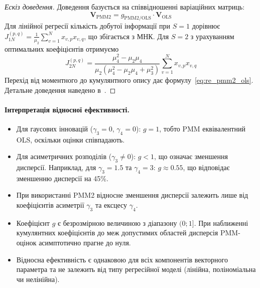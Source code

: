 \documentclass[12pt,a4paper]{article}
\begin{document}
\begin{proof}[Ескіз доведення]
Доведення базується на співвідношенні варіаційних матриць:
\begin{equation}
\mathbf{V}_{\text{PMM2}} = g_{\text{PMM2/OLS}} \cdot \mathbf{V}_{\text{OLS}}
\end{equation}
Для лінійної регресії кількість добутої інформації при $S=1$ дорівнює $J_{1N}^{(p,q)} = \frac{1}{\mu_2}\sum_{v=1}^{N} x_{v,p} x_{v,q}$, що збігається з МНК. Для $S=2$ з урахуванням оптимальних коефіцієнтів отримуємо
\begin{equation}
J_{2N}^{(p,q)} = \frac{\mu_4^2 - \mu_2\mu_4}{\mu_2(\mu_4^2 - \mu_2\mu_4 + \mu_3^2)} \sum_{v=1}^{N} x_{v,p} x_{v,q}
\end{equation}
Перехід від моментного до кумулянтного опису дає формулу~\eqref{eq:re_pmm2_ols}. Детальне доведення наведено в~\cite{kunchenko2002polynomial}.
\end{proof}

\paragraph{Інтерпретація відносної ефективності.}

\begin{itemize}
    \item Для гаусових інновацій ($\gamma_3 = 0$, $\gamma_4 = 0$): $g = 1$, тобто PMM еквівалентний OLS, оскільки оцінки співпадають.

    \item Для асиметричних розподілів ($\gamma_3 \neq 0$): $g < 1$, що означає зменшення дисперсії. Наприклад, для $\gamma_3 = 1.5$ та $\gamma_4 = 3$: $g \approx 0.55$, що відповідає зменшенню дисперсії на 45\%.

    \item При використанні PMM2 відносне зменшення дисперсії залежить лише від коефіцієнтів асиметрії $\gamma_3$ та ексцесу $\gamma_4$.

    \item Коефіцієнт $g$ є безрозмірною величиною з діапазону $(0;1]$. При наближенні кумулянтних коефіцієнтів до меж допустимих областей дисперсія PMM-оцінок асимптотично прагне до нуля.

    \item Відносна ефективність є однаковою для всіх компонентів векторного параметра та не залежить від типу регресійної моделі (лінійна, поліноміальна чи нелінійна).
\end{itemize}
\end{document}
